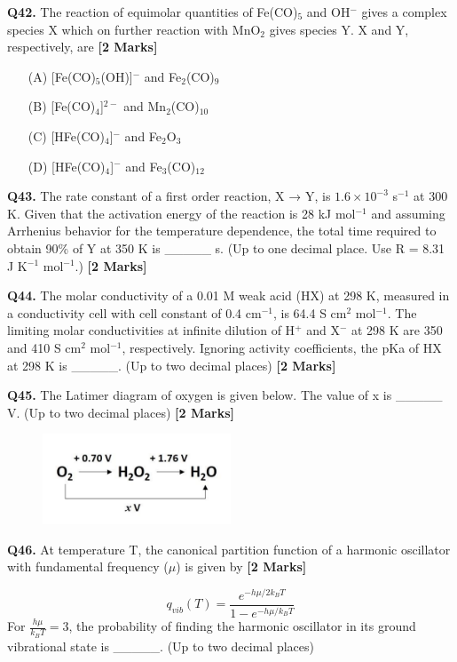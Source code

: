 \documentclass[11pt]{article}
\newcommand{\questionb}[2]{
    \noindent\textbf{Q#2.} #1 \hfill \textbf{[2 Marks]}
}
\begin{document}
\questionb{The reaction of equimolar quantities of Fe(CO)$_5$ and OH$^-$ gives a complex species X which on further reaction with MnO$_2$ gives species Y. X and Y, respectively, are}{42}
\begin{enumerate}
    \item[(A)] [Fe(CO)$_5$(OH)]$^-$ and Fe$_2$(CO)$_9$
    \item[(B)] [Fe(CO)$_4$]$^{2-}$ and Mn$_2$(CO)$_{10}$
    \item[(C)] [HFe(CO)$_4$]$^-$ and Fe$_2$O$_3$
    \item[(D)] [HFe(CO)$_4$]$^-$ and Fe$_3$(CO)$_{12}$
\end{enumerate}
\vspace{0.5cm}

\questionb{The rate constant of a first order reaction, X → Y, is $1.6 \times 10^{-3}$ s$^{-1}$ at 300 K. Given that the activation energy of the reaction is 28 kJ mol$^{-1}$ and assuming Arrhenius behavior for the temperature dependence, the total time required to obtain 90\% of Y at 350 K is \_\_\_\_\_ s. (Up to one decimal place. Use R = 8.31 J K$^{-1}$ mol$^{-1}$.)}{43}
\vspace{0.5cm}

\questionb{The molar conductivity of a 0.01 M weak acid (HX) at 298 K, measured in a conductivity cell with cell constant of 0.4 cm$^{-1}$, is 64.4 S cm$^2$ mol$^{-1}$. The limiting molar conductivities at infinite dilution of H$^+$ and X$^-$ at 298 K are 350 and 410 S cm$^2$ mol$^{-1}$, respectively. Ignoring activity coefficients, the pKa of HX at 298 K is \_\_\_\_\_. (Up to two decimal places)}{44}
\vspace{0.5cm}

\questionb{The Latimer diagram of oxygen is given below. The value of x is \_\_\_\_\_ V. (Up to two decimal places)}{45}
\begin{figure}[h]
\centering
\includegraphics[width=0.5\textwidth]{figures/45}
\end{figure}
\vspace{0.5cm}

\questionb{At temperature T, the canonical partition function of a harmonic oscillator with fundamental frequency ($\mu$) is given by}{46}
\[ q_{vib}(T) = \frac{e^{-h\mu/2k_BT}}{1 - e^{-h\mu/k_BT}} \]
For $\frac{h\mu}{k_BT} = 3$, the probability of finding the harmonic oscillator in its ground vibrational state is \_\_\_\_\_. (Up to two decimal places)
\vspace{0.5cm}
\end{document}
